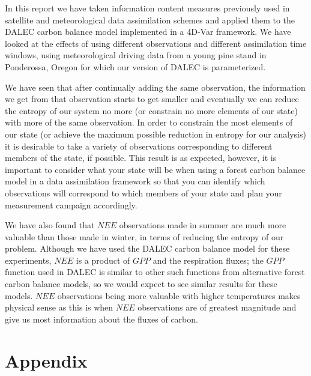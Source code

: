 \documentclass[11pt]{article}
\begin{document}
In this report we have taken information content measures previously used in satellite and meteorological data assimilation schemes \cite{stewart2008correlated, fisher2003estimation, sandu2012practical} and applied them to the DALEC carbon balance model \cite{williams2005improved} implemented in a 4D-Var framework. We have looked at the effects of using different observations and different assimilation time windows, using meteorological driving data from a young pine stand in Ponderossa, Oregon for which our version of DALEC is parameterized. 

We have seen that after continually adding the same observation, the information we get from that observation starts to get smaller and eventually we can reduce the entropy of our system no more (or constrain no more elements of our state) with more of the same observation. In order to constrain the most elements of our state (or achieve the maximum possible reduction in entropy for our analysis) it is desirable to take a variety of observations corresponding to different members of the state, if possible. This result is as expected, however, it is important to consider what your state will be when using a forest carbon balance model in a data assimilation framework so that you can identify which observations will correspond to which members of your state and plan your measurement campaign accordingly.

We have also found that $NEE$ observations made in summer are much more valuable than those made in winter, in terms of reducing the entropy of our problem. Although we have used the DALEC carbon balance model for these experiments, $NEE$ is a product of $GPP$ and the respiration fluxes; the $GPP$ function used in DALEC is similar to other such functions from alternative forest carbon balance models, so we would expect to see similar results for these models. $NEE$ observations being more valuable with higher temperatures makes physical sense as this is when $NEE$ observations are of greatest magnitude and give us most information about the fluxes of carbon.    

{}


\section*{Appendix}
\end{document}
